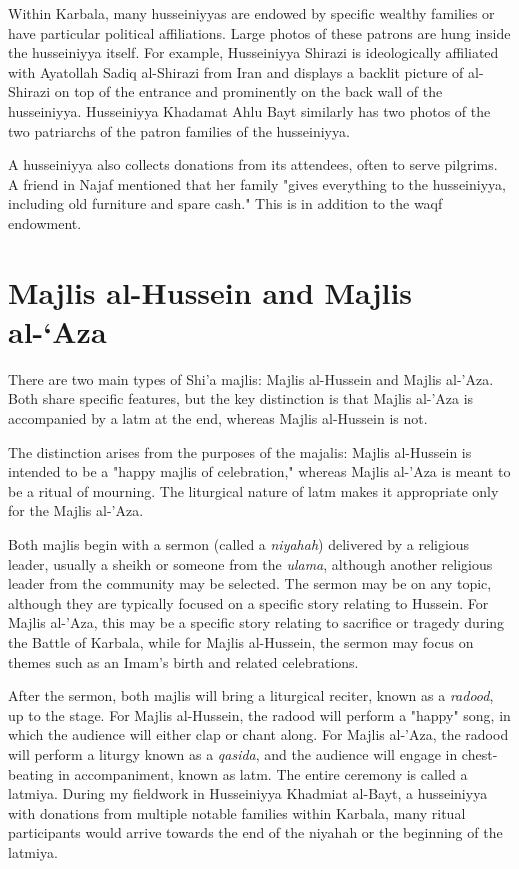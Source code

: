 Within Karbala, many husseiniyyas are endowed by specific wealthy families or have particular political affiliations. Large photos of these patrons are hung inside the husseiniyya itself. For example, Husseiniyya Shirazi is ideologically affiliated with Ayatollah Sadiq al-Shirazi from Iran and displays a backlit picture of al-Shirazi on top of the entrance and prominently on the back wall of the husseiniyya. Husseiniyya Khadamat Ahlu Bayt similarly has two photos of the two patriarchs of the patron families of the husseiniyya.

A husseiniyya also collects donations from its attendees, often to serve pilgrims. A friend in Najaf mentioned that her family "gives everything to the husseiniyya, including old furniture and spare cash." This is in addition to the waqf endowment. 

\section{Majlis al-Hussein and Majlis al-‘Aza}
There are two main types of Shi'a majlis: Majlis al-Hussein and Majlis al-'Aza. Both share specific features, but the key distinction is that Majlis al-'Aza is accompanied by a latm at the end, whereas Majlis al-Hussein is not.

The distinction arises from the purposes of the majalis: Majlis al-Hussein is intended to be a "happy majlis of celebration," \cite{al-husseini_interview_2022} whereas Majlis al-'Aza is meant to be a ritual of mourning. The liturgical nature of latm makes it appropriate only for the Majlis al-'Aza.

Both majlis begin with a sermon (called a \emph{niyahah}) delivered by a religious leader, usually a sheikh or someone from the \emph{ulama}, although another religious leader from the community may be selected. The sermon may be on any topic, although they are typically focused on a specific story relating to Hussein. For Majlis al-'Aza, this may be a specific story relating to sacrifice or tragedy during the Battle of Karbala, while for Majlis al-Hussein, the sermon may focus on themes such as an Imam's birth and related celebrations.

After the sermon, both majlis will bring a liturgical reciter, known as a \emph{radood}, up to the stage. For Majlis al-Hussein, the radood will perform a "happy" song, in which the audience will either clap or chant along. For Majlis al-'Aza, the radood will perform a liturgy known as a \emph{qasida}, and the audience will engage in chest-beating in accompaniment, known as latm. The entire ceremony is called a latmiya. During my fieldwork in Husseiniyya Khadmiat al-Bayt, a husseiniyya with donations from multiple notable families within Karbala, many ritual participants would arrive towards the end of the niyahah or the beginning of the latmiya.

